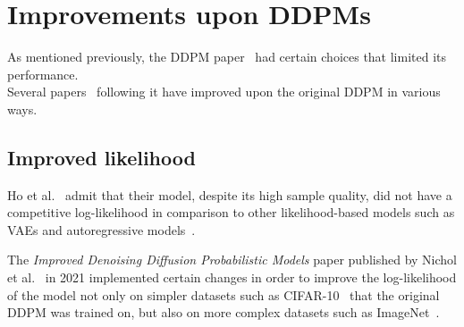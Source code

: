 \documentclass[twoside]{article}
\numberwithin{equation}{section}
\numberwithin{figure}{section}
\begin{document}
\newpage
\section{Improvements upon DDPMs}\label{improvements}

As mentioned previously, the DDPM paper~\cite{ho2020denoising} had certain choices that limited its performance.\\
Several papers~\cite{nichol2021improved, song2022denoising} following it have improved upon the original DDPM in various ways.

\subsection{Improved likelihood}
Ho et al.~\cite{ho2020denoising} admit that their model, despite its high sample quality, did not have a competitive log-likelihood in comparison to other likelihood-based models such as VAEs and autoregressive models~\cite{nichol2021improved}.

The \textit{Improved Denoising Diffusion Probabilistic Models} paper published by Nichol et al.~\cite{nichol2021improved} in 2021 implemented certain changes in order to improve the log-likelihood of the model not only on simpler datasets such as CIFAR-10~\cite{cifar10} that the original DDPM was trained on, but also on more complex datasets such as ImageNet~\cite{kingma2022autoencoding, nichol2021improved, oord2016conditional}.
\end{document}
